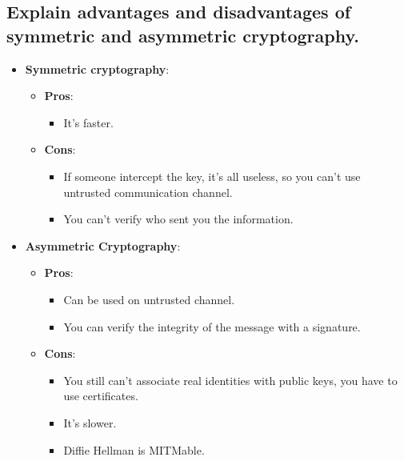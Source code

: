\documentclass[9pt, letterpaper]{article}
\begin{document}
\subsection{Explain advantages and disadvantages of symmetric and asymmetric cryptography.}
\begin{itemize}
	\item \textbf{Symmetric cryptography}:
	      \begin{itemize}
		      \item \textbf{Pros}:
		            \begin{itemize}
			            \item It's faster.
		            \end{itemize}
		      \item \textbf{Cons}:
		            \begin{itemize}
			            \item If someone intercept the key, it's all useless, so you can't use untrusted communication channel.
			            \item You can't verify who sent you the information.
		            \end{itemize}
	      \end{itemize}
	\item \textbf{Asymmetric Cryptography}:
	      \begin{itemize}
		      \item \textbf{Pros}:
		            \begin{itemize}
			            \item Can be used on untrusted channel.
			            \item You can verify the integrity of the message with a signature.
		            \end{itemize}
		      \item \textbf{Cons}:
		            \begin{itemize}
			            \item You still can't associate real identities with public keys, you have to use certificates.
			            \item It's slower.
			            \item Diffie Hellman is MITMable.
		            \end{itemize}
	      \end{itemize}
\end{itemize}
\end{document}
